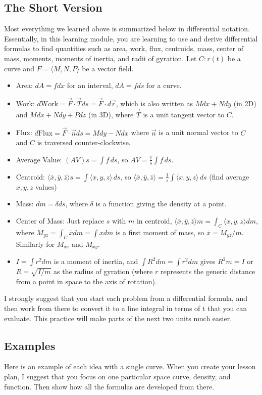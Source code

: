 \subsection{The Short Version}
Most everything we learned above is summarized below in differential
notation.  Essentially, in this learning module, you are learning to
use and derive differential formulas to find quantities such as area,
work, flux, centroids, mass, center of mass, moments, moments of
inertia, and radii of gyration.  Let $C\colon r(t)$ be a curve and
$F=\langle M,N,P\rangle$ be a vector field.
\begin{itemize}
\item Area: $dA = fdx$ for an interval, $dA=fds $ for a curve.

\item Work: $d\text{Work} = \vec F\cdot \vec T ds = \vec F\cdot d\vec r$, which is also written as $Mdx+Ndy$ (in 2D) and $Mdx+Ndy+Pdz$ (in 3D), where $\vec T$ is
a unit tangent vector to $C$.
\item Flux: $d\text{Flux} = \vec F\cdot \vec n ds = Mdy-Ndx$ where $\vec
n$ is a unit normal vector to $C$ and $C$ is traversed counter-clockwise.
\item Average Value: $(AV) s = \int f \,ds$, so $AV=\frac 1 s \int f\,ds$.
\item Centroid: $\langle\bar x,\bar y,\bar z\rangle s =\int
\langle x,y,z\rangle\, ds$, so $\langle\bar x,\bar y,\bar z\rangle= \frac 1 s \int \langle x,y,z\rangle\,ds$ (find average $x,y,z$ values)
\item Mass: $dm = \delta ds $, where $\delta$ is a function giving the density at a point.
\item Center of Mass: Just replace $s$ with $m$ in centroid,
$\langle\bar x,\bar y,\bar z\rangle m = \int_C \langle x,y,z\rangle dm$,
where $M_{yz}=\int_C \bar x dm = \int x dm$ is a first moment of mass, so $\bar x = M_{yz}/m$.  Similarly for $M_{xz}$ and $M_{xy}$.
\item $I = \int r^2 dm$ is a moment of inertia, and $\int R^2 dm = \int r^2 dm$
gives $R^2 m =I$ or $R=\sqrt{I/m}$ as the radius of gyration (where
$r$ represents the generic distance from a point in space to the axis
of rotation).
\end{itemize}
I strongly suggest that you start each problem from a differential
formula, and then work from there to convert it to a line integral in
terms of t that you can evaluate.  This practice will make parts of
the next two units much easier.


\subsection{Examples}
Here is an example of each idea with a single curve. When you create
your lesson plan, I suggest that you focus on one particular space
curve, density, and function.  Then show how all the formulas are
developed from there.

